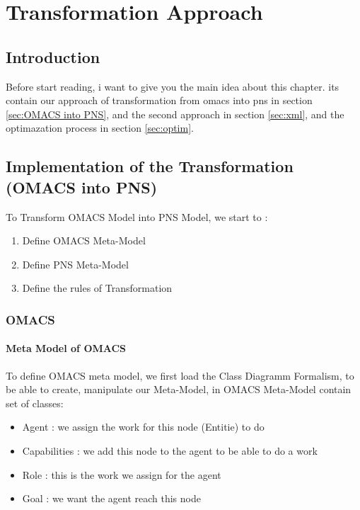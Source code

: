 
\chapter{\label{cha: Transformation Approach } Transformation Approach}
\section{Introduction}
Before start reading, i want to give you the main idea about this chapter. its contain our approach of transformation from omacs into pns in section \ref{sec:OMACS into PNS}, and the second approach in section \ref{sec:xml}, and the optimazation process in section \ref{sec:optim}.

\section{Implementation of the Transformation (OMACS into PNS)\label{sec:OMACS into PNS} }%
To Transform OMACS Model into PNS Model, we start to :
\begin{enumerate}
\item Define OMACS Meta-Model 
\item Define PNS Meta-Model
\item Define the rules of Transformation
\end{enumerate}


\subsection{OMACS} 
\subsubsection{Meta Model of OMACS}
\vspace{0.5cm}
To define OMACS meta model, we first load the Class Diagramm Formalism, to be able to create, manipulate our Meta-Model,
in OMACS Meta-Model contain set of classes:
\pagebreak
\begin{itemize}
	\item Agent  : we assign the work for this node (Entitie) to do 
	\item Capabilities : we add this node to the agent to be able to do a work
	\item Role : this is the work we assign for the agent 
	\item Goal : we want the agent reach this node 
\end{itemize}
 
